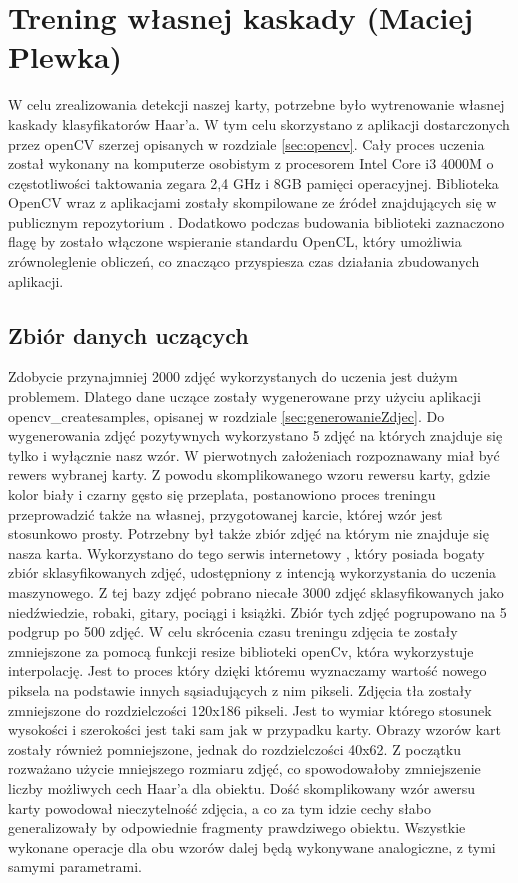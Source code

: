 \section{Trening własnej kaskady (Maciej Plewka)}

W celu zrealizowania detekcji naszej karty, potrzebne było wytrenowanie własnej kaskady klasyfikatorów Haar'a. W tym celu skorzystano z aplikacji dostarczonych przez openCV szerzej opisanych w rozdziale \ref{sec:opencv}. Cały proces uczenia został wykonany na komputerze osobistym z procesorem Intel Core i3 4000M o częstotliwości taktowania zegara 2,4 GHz i 8GB pamięci operacyjnej. Biblioteka OpenCV wraz z aplikacjami zostały skompilowane ze źródeł znajdujących się w publicznym repozytorium \cite{OpenCVSource}. Dodatkowo podczas budowania biblioteki zaznaczono flagę by zostało włączone wspieranie standardu OpenCL, który umożliwia zrównoleglenie obliczeń, co znacząco przyspiesza czas działania zbudowanych aplikacji.

\subsection{Zbiór danych uczących}

Zdobycie przynajmniej 2000 zdjęć wykorzystanych do uczenia jest dużym problemem. Dlatego dane uczące zostały wygenerowane przy użyciu aplikacji opencv\_createsamples, opisanej w rozdziale \ref{sec:generowanieZdjec}. Do wygenerowania zdjęć pozytywnych wykorzystano 5 zdjęć na których znajduje się tylko i wyłącznie nasz wzór. W pierwotnych założeniach rozpoznawany miał być rewers wybranej karty. Z powodu skomplikowanego wzoru rewersu karty, gdzie kolor biały i czarny gęsto się przeplata, postanowiono proces treningu przeprowadzić także na własnej, przygotowanej karcie, której wzór jest stosunkowo prosty. Potrzebny był także zbiór zdjęć na którym nie znajduje się nasza karta. Wykorzystano do tego serwis internetowy \cite{imageNetOrg}, który posiada bogaty zbiór sklasyfikowanych zdjęć, udostępniony z intencją wykorzystania do uczenia maszynowego. Z tej bazy zdjęć pobrano niecałe 3000 zdjęć sklasyfikowanych jako niedźwiedzie, robaki, gitary, pociągi i książki. Zbiór tych zdjęć pogrupowano na 5 podgrup po 500 zdjęć. W celu skrócenia czasu treningu zdjęcia te zostały zmniejszone za pomocą funkcji resize biblioteki openCv, która wykorzystuje interpolację. Jest to proces który dzięki któremu wyznaczamy wartość nowego piksela na podstawie innych sąsiadujących z nim pikseli. Zdjęcia tła zostały zmniejszone do rozdzielczości 120x186 pikseli. Jest to wymiar którego stosunek wysokości i szerokości jest taki sam jak w przypadku karty. Obrazy wzorów kart zostały również pomniejszone, jednak do rozdzielczości 40x62. Z początku rozważano użycie mniejszego rozmiaru zdjęć, co spowodowałoby zmniejszenie liczby możliwych cech Haar'a dla obiektu. Dość skomplikowany wzór awersu karty powodował nieczytelność zdjęcia, a co za tym idzie cechy słabo generalizowały by odpowiednie fragmenty prawdziwego obiektu. Wszystkie wykonane operacje dla obu wzorów dalej będą wykonywane analogiczne, z tymi samymi parametrami.


